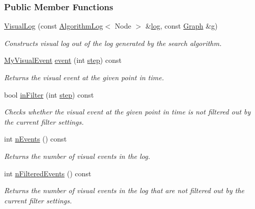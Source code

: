 \subsubsection*{Public Member Functions}
\begin{DoxyCompactItemize}
\item 
\hyperlink{structslb_1_1core_1_1ui_1_1VisualLog_a5e879f6792d93b3ef51f0243d0c12948}{Visual\+Log} (const \hyperlink{structslb_1_1core_1_1ui_1_1AlgorithmLog}{Algorithm\+Log}$<$ Node $>$ \&\hyperlink{structslb_1_1core_1_1ui_1_1VisualLog_aba8162dcd351b18846b8a1aec03bbc64}{log}, const \hyperlink{structslb_1_1core_1_1ui_1_1StateGraph}{Graph} \&g)
\begin{DoxyCompactList}\small\item\em Constructs visual log out of the log generated by the search algorithm. \end{DoxyCompactList}\item 
\hyperlink{structslb_1_1core_1_1ui_1_1VisualLog_a6c09f9d1c9f6159c6a151a2795b5295e}{My\+Visual\+Event} \hyperlink{structslb_1_1core_1_1ui_1_1VisualLog_a6b4d1aa908c56156d3a327b3fc9397b3}{event} (int \hyperlink{structslb_1_1core_1_1ui_1_1VisualLog_a94ff08077c466eadb304d2564a22869c}{step}) const 
\begin{DoxyCompactList}\small\item\em Returns the visual event at the given point in time. \end{DoxyCompactList}\item 
bool \hyperlink{structslb_1_1core_1_1ui_1_1VisualLog_a2998fb13fa3b8d956e46a0b3291ec58c}{in\+Filter} (int \hyperlink{structslb_1_1core_1_1ui_1_1VisualLog_a94ff08077c466eadb304d2564a22869c}{step}) const 
\begin{DoxyCompactList}\small\item\em Checks whether the visual event at the given point in time is not filtered out by the current filter settings. \end{DoxyCompactList}\item 
int \hyperlink{structslb_1_1core_1_1ui_1_1VisualLog_a49f31778cc7dec96e8ae19c3286d8242}{n\+Events} () const 
\begin{DoxyCompactList}\small\item\em Returns the number of visual events in the log. \end{DoxyCompactList}\item 
int \hyperlink{structslb_1_1core_1_1ui_1_1VisualLog_a817b103fe9fc05de04d7ddf4b26d8076}{n\+Filtered\+Events} () const 
\begin{DoxyCompactList}\small\item\em Returns the number of visual events in the log that are not filtered out by the current filter settings. \end{DoxyCompactList}\item 

\end{DoxyCompactItemize}
